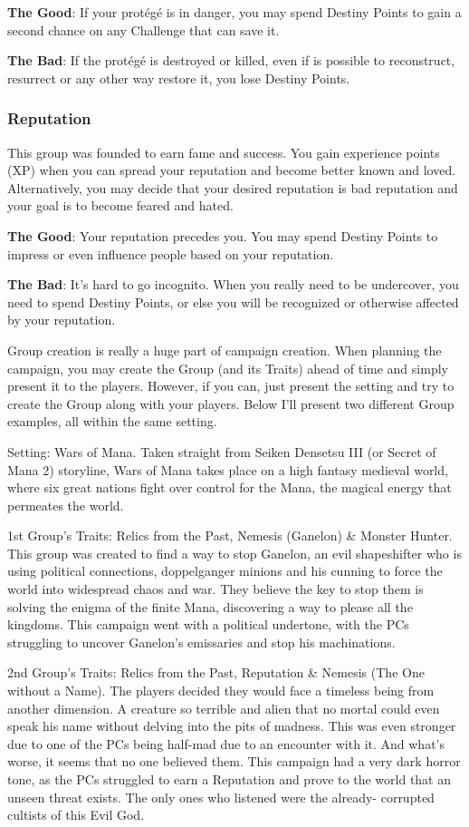 \begin{multicols}{2}
\textbf{The Good}: If your protégé is in danger, you
may spend Destiny Points to gain a second chance
on any Challenge that can save it.

\textbf{The Bad}: If the protégé is destroyed or
killed, even if is possible to reconstruct, resurrect
or any other way restore it, you lose Destiny Points.

\subsubsection{Reputation}
This group was founded to earn fame and
success. You gain experience points (XP) when you
can spread your reputation and become better
known and loved. Alternatively, you may decide
that your desired reputation is bad reputation and
your goal is to become feared and hated.

\textbf{The Good}: Your reputation precedes you.
You may spend Destiny Points to impress or even
influence people based on your reputation.

\textbf{The Bad}: It's hard to go incognito. When
you really need to be undercover, you need to
spend Destiny Points, or else you will be
recognized or otherwise affected by your
reputation.

Group creation is really a huge part of campaign
creation. When planning the campaign, you may create
the Group (and its Traits) ahead of time and simply
present it to the players. However, if you can, just present
the setting and try to create the Group along with your
players. Below I'll present two different Group examples,
all within the same setting.

Setting: Wars of Mana. Taken straight from Seiken
Densetsu III (or Secret of Mana 2) storyline, Wars of
Mana takes place on a high fantasy medieval world, where
six great nations fight over control for the Mana, the
magical energy that permeates the world.

1st Group's Traits: Relics from the Past, Nemesis
(Ganelon) \& Monster Hunter. This group was created to
find a way to stop Ganelon, an evil shapeshifter who is
using political connections, doppelganger minions and his
cunning to force the world into widespread chaos and war.
They believe the key to stop them is solving the enigma
of the finite Mana, discovering a way to please all the
kingdoms. This campaign went with a political undertone,
with the PCs struggling to uncover Ganelon's emissaries
and stop his machinations.

2nd Group's Traits: Relics from the Past, Reputation
\& Nemesis (The One without a Name). The players
decided they would face a timeless being from another
dimension. A creature so terrible and alien that no mortal
could even speak his name without delving into the pits
of madness. This was even stronger due to one of the PCs
being half-mad due to an encounter with it. And what’s
worse, it seems that no one believed them. This campaign
had a very dark horror tone, as the PCs struggled to earn
a Reputation and prove to the world that an unseen threat
exists. The only ones who listened were the already-
corrupted cultists of this Evil God.


\end{multicols}
